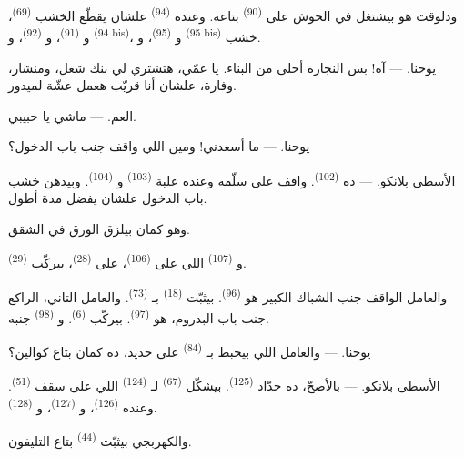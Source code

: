 ودلوقت هو بيشتغل في الحوش على  \textsuperscript{(90)} بتاعه. وعنده
 \textsuperscript{(94)} علشان يقطّع الخشب \textsuperscript{(69)}،
و \textsuperscript{(91)}، و \textsuperscript{(92)}، و
\textsuperscript{(94 bis)}، و \textsuperscript{(95)}، و
\textsuperscript{(95 bis)} خشب.

\textsc{يوحنا}. --- آه! بس النجارة أحلى من البناء. يا عمّي، هتشتري لي بنك شغل،
ومنشار، وفارة، علشان أنا قريّب هعمل عشّة لميدور.

\textsc{العم}. --- ماشي يا حبيبي.

\textsc{يوحنا}. --- ما أسعدني! ومين اللي واقف جنب باب الدخول؟

\VUsaut{3.0mm}
\VUsaut{3.0mm}

\textsc{الأسطى بلانكو}. --- ده  \textsuperscript{(102)}. واقف على سلّمه
وعنده علبة  \textsuperscript{(103)} و \textsuperscript{(104)}.
وبيدهن
خشب باب الدخول علشان يفضل مدة أطول.

وهو كمان بيلزق الورق في الشقق.

و \textsuperscript{(107)} اللي على  \textsuperscript{(106)}،
على
 \textsuperscript{(28)}، بيركّب  \textsuperscript{(29)}.

والعامل الواقف جنب الشباك الكبير هو  \textsuperscript{(96)}. بيثبّت
 \textsuperscript{(18)} بـ \textsuperscript{(73)}.
والعامل
التاني، الراكع جنب باب البدروم، هو  \textsuperscript{(97)}. بيركّب
 \textsuperscript{(6)}. و \textsuperscript{(98)} جنبه.

\textsc{يوحنا}. --- والعامل اللي بيخبط بـ \textsuperscript{(84)} على حديد،
ده كمان بتاع كوالين؟

\textsc{الأسطى بلانكو}. --- بالأصحّ، ده حدّاد \textsuperscript{(125)}. بيشكّل
 \textsuperscript{(67)} لـ \textsuperscript{(124)} اللي على سقف
 \textsuperscript{(51)}. وعنده  \textsuperscript{(126)}،
و \textsuperscript{(127)}، و \textsuperscript{(128)}.

والكهربجي بيثبّت   \textsuperscript{(44)} بتاع التليفون.

